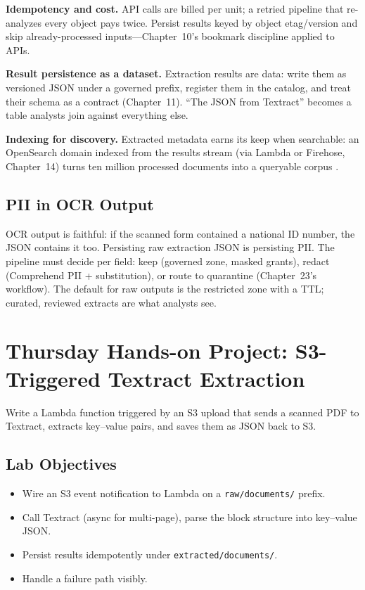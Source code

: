 \textbf{Idempotency and cost.} API calls are billed per unit; a retried pipeline that re-analyzes every object pays twice. Persist results keyed by object etag/version and skip already-processed inputs---Chapter~10's bookmark discipline applied to APIs.

\textbf{Result persistence as a dataset.} Extraction results are data: write them as versioned JSON under a governed prefix, register them in the catalog, and treat their schema as a contract (Chapter~11). ``The JSON from Textract'' becomes a table analysts join against everything else.

\textbf{Indexing for discovery.} Extracted metadata earns its keep when searchable: an OpenSearch domain indexed from the results stream (via Lambda or Firehose, Chapter~14) turns ten million processed documents into a queryable corpus \cite{awsOpenSearchDocs}.

\subsection{PII in OCR Output}
OCR output is faithful: if the scanned form contained a national ID number, the JSON contains it too. Persisting raw extraction JSON is persisting PII. The pipeline must decide per field: keep (governed zone, masked grants), redact (Comprehend PII + substitution), or route to quarantine (Chapter~23's workflow). The default for raw outputs is the restricted zone with a TTL; curated, reviewed extracts are what analysts see.

\section{Thursday Hands-on Project: S3-Triggered Textract Extraction}
Write a Lambda function triggered by an S3 upload that sends a scanned PDF to Textract, extracts key--value pairs, and saves them as JSON back to S3.

\subsection*{Lab Objectives}
\begin{itemize}
    \item Wire an S3 event notification to Lambda on a \texttt{raw/documents/} prefix.
    \item Call Textract (async for multi-page), parse the block structure into key--value JSON.
    \item Persist results idempotently under \texttt{extracted/documents/}.
    \item Handle a failure path visibly.
\end{itemize}

